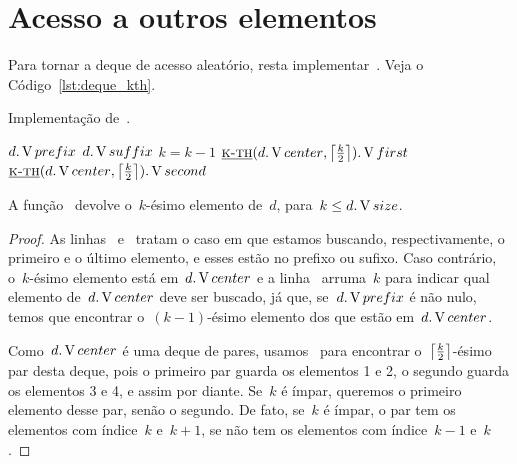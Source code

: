 \documentclass[main.tex]{subfiles}
\begin{document}
\section{Acesso a outros elementos}

Para tornar a deque de acesso aleatório, resta implementar~. Veja o Código~\ref{lst:deque_kth}.

\begin{algorithm}
\caption{Implementação de~.} \label{lst:deque_kth}
\begin{algorithmic}[1]

		\State \Return $d.\V{prefix}$\label{line:kth:if1}
	\EndIf
		\State \Return $d.\V{suffix}$ \label{line:kth:if2}
	\EndIf
		\State $k = k - 1$ \label{line:kth:if3}
	\EndIf
		\State \Return $\funcAPI{k-th}{d.\V{center}, \ceil*{\frac{k}{2}}}.\V{first}$
	\Else
		\State \Return $\funcAPI{k-th}{d.\V{center}, \ceil*{\frac{k}{2}}}.\V{second}$
	\EndIf
\EndFunction

\end{algorithmic}
\end{algorithm}


\begin{proposition}
A função~ devolve o~$k$-ésimo elemento de~$d$, para~$k \leq d.\V{size}$.
\end{proposition}

\begin{proof}
As linhas~ e~ tratam o caso em que estamos buscando, respectivamente, o primeiro e o último elemento, e esses estão no prefixo ou sufixo. Caso contrário, o~$k$-ésimo elemento está em~$d.\V{center}$ e a linha~ arruma~$k$ para indicar qual elemento de~$d.\V{center}$ deve ser buscado, já que, se~$d.\V{prefix}$ é não nulo, temos que encontrar o~$(k-1)$-ésimo elemento dos que estão em~$d.\V{center}$.

Como~$d.\V{center}$ é uma deque de pares, usamos~ para encontrar o~$\ceil*{\frac{k}{2}}$-ésimo par desta deque, pois o primeiro par guarda os elementos 1 e 2, o segundo guarda os elementos 3 e 4, e assim por diante. Se~$k$ é ímpar, queremos o primeiro elemento desse par, senão o segundo. De fato, se~$k$ é ímpar, o par tem os elementos com índice~$k$ e~$k+1$, se não tem os elementos com índice~$k-1$ e~$k$.
\end{proof}
\end{document}
